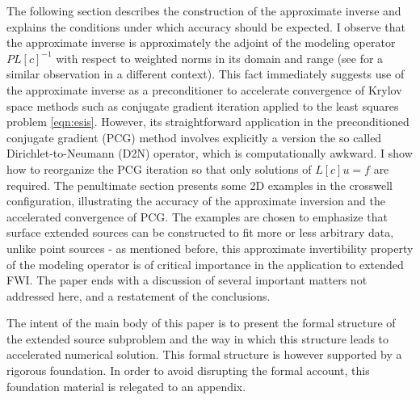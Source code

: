 The following section describes the construction of the approximate inverse and explains the conditions under which accuracy should be expected. I observe that the approximate inverse is approximately the adjoint of the modeling operator $PL[c]^{-1}$ with respect to weighted norms in its domain and range (see \cite{HouSymes:15} for a similar observation in a different context). This fact immediately suggests use of the approximate inverse as a preconditioner to accelerate convergence of Krylov space methods such as conjugate gradient iteration applied to the least squares problem \ref{eqn:esis}. However, its straightforward application in the preconditioned conjugate gradient (PCG) method \cite[]{Golub:2012} involves explicitly a version the so called Dirichlet-to-Neumann (D2N) operator, which is computationally awkward. I show how to reorganize the PCG iteration so that only solutions of $L[c]u=f$ are required. The penultimate section presents some 2D examples in the crosswell configuration, illustrating the accuracy of the approximate inversion and the accelerated convergence of PCG. The examples are chosen to emphasize that surface extended sources can be constructed to fit more or less arbitrary data, unlike point sources - as mentioned before, this approximate invertibility property of the modeling operator is of critical importance in the application to extended FWI. The paper ends with a discussion of several important matters not addressed here, and a restatement of the conclusions.

The intent of the main body of this paper is to present the formal structure of the extended source subproblem and the way in which this structure leads to accelerated numerical solution. This formal structure is however supported by a rigorous foundation. In order to avoid disrupting the formal account, this foundation material is relegated to an appendix.



